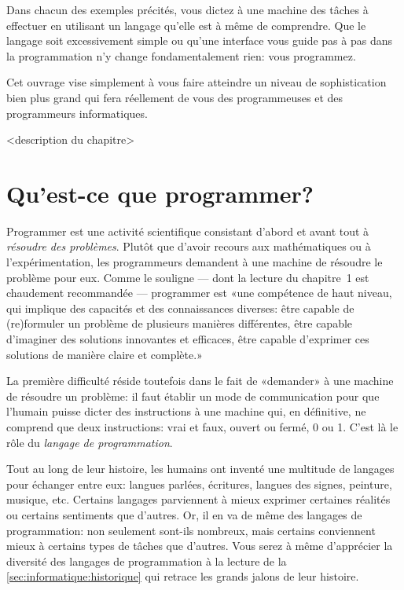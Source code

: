 Dans chacun des exemples précités, vous dictez à une machine
des tâches à effectuer en utilisant un langage qu'elle est à même de
comprendre. Que le langage soit excessivement simple ou qu'une
interface vous guide pas à pas dans la programmation n'y change
fondamentalement rien: vous programmez.

Cet ouvrage vise simplement à vous faire atteindre un niveau de
sophistication bien plus grand qui fera réellement de vous des
programmeuses et des programmeurs informatiques.

<description du chapitre>

\section{Qu'est-ce que programmer?}
\label{sec:informatique:programmer?}

Programmer est une activité scientifique consistant d'abord et avant
tout à \emph{résoudre des problèmes}. Plutôt que d'avoir recours aux
mathématiques ou à l'expérimentation, les programmeurs demandent à une
machine de résoudre le problème pour eux. Comme le souligne
\citet{Swinnen:python:2012} --- dont la lecture du chapitre~1 est
chaudement recommandée --- programmer est «une compétence de haut
niveau, qui implique des capacités et des connaissances diverses: être
capable de (re)formuler un problème de plusieurs manières différentes,
être capable d’imaginer des solutions innovantes et efficaces, être
capable d’exprimer ces solutions de manière claire et complète.»

La première difficulté réside toutefois dans le fait de «demander» à
une machine de résoudre un problème: il faut établir un mode de
communication pour que l'humain puisse dicter des instructions à une
machine qui, en définitive, ne comprend que deux instructions: vrai et
faux, ouvert ou fermé, 0 ou 1. C'est là le rôle du \emph{langage de
  programmation}.

Tout au long de leur histoire, les humains ont inventé une multitude
de langages pour échanger entre eux: langues parlées, écritures,
langues des signes, peinture, musique, etc. Certains langages
parviennent à mieux exprimer certaines réalités ou certains sentiments
que d'autres. Or, il en va de même des langages de programmation: non
seulement sont-ils nombreux, mais certains conviennent mieux à
certains types de tâches que d'autres. Vous serez à même d'apprécier
la diversité des langages de programmation à la lecture de la
\autoref{sec:informatique:historique} qui retrace les grands jalons de
leur histoire.

